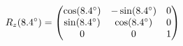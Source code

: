 \documentclass[preview]{standalone}
\begin{document}
\begin{align*}
\special{dvisvgm:raw <g id='unique000'>}R_z(8.4^\circ) = \begin{pmatrix} \cos(8.4^\circ) & -\sin(8.4^\circ) & 0 \\ \sin(8.4^\circ) & \cos(8.4^\circ) & 0 \\ 0 & 0 & 1 \end{pmatrix}\special{dvisvgm:raw </g>}
\end{align*}
\end{document}
